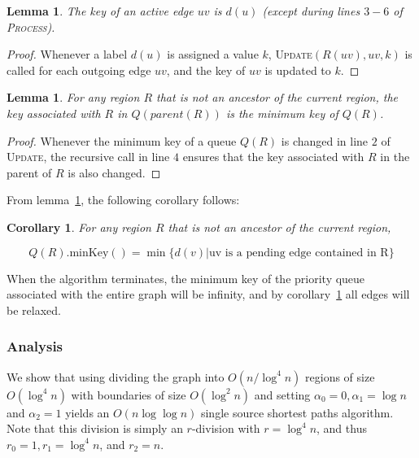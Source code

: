 \documentclass[12pt]{article}
\newtheorem{corollary}{Corollary}[theorem]
\newtheorem{lemma}[theorem]{Lemma}
\begin{document}
\begin{lemma}
  The key of an active edge $uv$ is $d(u)$ (except during lines $3-6$ of \textsc{Process}).
\end{lemma}

\begin{proof}
  Whenever a label $d(u)$ is assigned a value $k$, \textsc{Update}$(R(uv),uv,k)$ is called for each outgoing edge $uv$, and the key of $uv$ is updated to $k$.
\end{proof}

\begin{lemma}
  \label{lemma:invariant}
  For any region $R$ that is not an ancestor of the current region, the key associated with $R$ in $Q(parent(R))$ is the minimum key of $Q(R)$.
\end{lemma}

\begin{proof}
  Whenever the minimum key of a queue $Q(R)$ is changed in line $2$ of \textsc{Update}, the recursive call in line $4$ ensures that the key associated with $R$ in the parent of $R$ is also changed.
\end{proof}

From lemma~\ref{lemma:invariant}, the following corollary follows:\\

\begin{corollary}
\label{cor:relaxed}
  For any region $R$ that is not an ancestor of the current region,

  \[
    Q(R).\text{minKey}() = \min \{ d(v) | \text{uv is a pending edge contained in R} \}
  \]
\end{corollary}

When the algorithm terminates, the minimum key of the priority queue associated with the entire graph will be infinity, and by corollary~\ref{cor:relaxed} all edges will be relaxed.

\subsubsection{Analysis}
\label{sec:analysis}

We show that using  dividing the graph into $O(n/\log^4n)$ regions of size $O(\log^4 n)$ with boundaries of size $O(\log^2 n)$ and setting $\alpha_0 = 0, \alpha_1 = \log n$ and $\alpha_2 = 1$ yields an $O(n \log \log n)$ single source shortest paths algorithm. Note that this division is simply an $r$-division with $r=\log^4 n$, and thus $r_0=1, r_1 = \log^4 n$, and $r_2 = n$.
\end{document}
